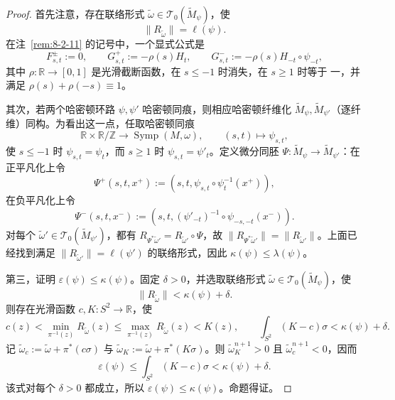 \begin{proof}
首先注意，存在联络形式
$\widetilde\omega\in\mathcal T_0(\widetilde M_\psi)$，使
\[
  \|R_{\widetilde\omega}\|=\ell(\psi).
\]
在注~\ref{rem:8-2-11} 的记号中，一个显式公式是
\[
  F_{s,t}^{\pm}:=0,
  \qquad G_{s,t}^+:=-\rho(s)H_t,
  \qquad G_{s,t}^-:=-\rho(s)H_{-t}\circ\psi_{-t},
\]
其中 $\rho:\mathbb R\to[0,1]$ 是光滑截断函数，在 $s\le-1$ 时消失，在 $s\ge1$ 时等于
一，并满足 $\rho(s)+\rho(-s)\equiv1$。

其次，若两个哈密顿环路 $\psi,\psi'$ 哈密顿同痕，则相应哈密顿纤维化
$\widetilde M_\psi,\widetilde M_{\psi'}$（逐纤维）同构。为看出这一点，任取哈密顿同痕
\[
  \mathbb R\times\mathbb R/\mathbb Z
  \longrightarrow\operatorname{Symp}(M,\omega),
  \qquad(s,t)\longmapsto\psi_{s,t},
\]
使 $s\le-1$ 时 $\psi_{s,t}=\psi_t$，而 $s\ge1$ 时
$\psi_{s,t}=\psi'_t$。定义微分同胚
$\Psi:\widetilde M_\psi\to\widetilde M_{\psi'}$：在正平凡化上令
\[
  \Psi^+(s,t,x^+)
  :=(s,t,\psi_{s,t}\circ\psi_t^{-1}(x^+)),
\]
在负平凡化上令
\[
  \Psi^-(s,t,x^-)
  :=(s,t,(\psi'_{-t})^{-1}\circ\psi_{-s,-t}(x^-)).
\]
对每个
$\widetilde\omega'\in\mathcal T_0(\widetilde M_{\psi'})$，都有
$R_{\Psi^*\widetilde\omega'}=R_{\widetilde\omega'}\circ\Psi$，故
$\|R_{\Psi^*\widetilde\omega'}\|=\|R_{\widetilde\omega'}\|$。上面已经找到满足
$\|R_{\widetilde\omega'}\|=\ell(\psi')$ 的联络形式，因此
$\kappa(\psi)\le\lambda(\psi)$。

第三，证明 $\varepsilon(\psi)\le\kappa(\psi)$。固定 $\delta>0$，并选取联络形式
$\widetilde\omega\in\mathcal T_0(\widetilde M_\psi)$，使
\[
  \|R_{\widetilde\omega}\|<\kappa(\psi)+\delta.
\]
则存在光滑函数 $c,K:S^2\to\mathbb R$，使
\[
  c(z)<\min_{\pi^{-1}(z)}R_{\widetilde\omega}(z)
  \le\max_{\pi^{-1}(z)}R_{\widetilde\omega}(z)<K(z),
  \qquad
  \int_{S^2}(K-c)\sigma<\kappa(\psi)+\delta.
\]
记
$\widetilde\omega_c:=\widetilde\omega+\pi^*(c\sigma)$ 与
$\widetilde\omega_K:=\widetilde\omega+\pi^*(K\sigma)$。则
$\widetilde\omega_K^{n+1}>0$ 且
$\widetilde\omega_c^{n+1}<0$，因而
\[
  \varepsilon(\psi)
  \le\int_{S^2}(K-c)\sigma
  <\kappa(\psi)+\delta.
\]
该式对每个 $\delta>0$ 都成立，所以
$\varepsilon(\psi)\le\kappa(\psi)$。命题得证。
\end{proof}

